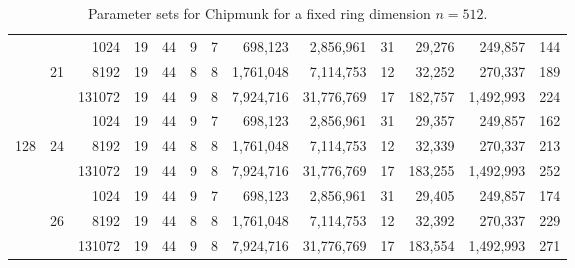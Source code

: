 \begin{table}
\begin{tabular}{ccr|c|cccrr|crr|c}
      &       &   1024 &         19 &        44 &          9 &       7 &        698,123 &  2,856,961 &    31 &       29,276 &   249,857 & 144 \\%
      &    21 &   8192 &         19 &        44 &          8 &       8 &      1,761,048 &  7,114,753 &    12 &       32,252 &   270,337 & 189 \\%
      &       & 131072 &         19 &        44 &          9 &       8 &      7,924,716 & 31,776,769 &    17 &      182,757 & 1,492,993 & 224 \\\cline{2-13}
  
      &       &   1024 &         19 &        44 &          9 &       7 &        698,123 &  2,856,961 &    31 &       29,357 &   249,857 & 162 \\%
  128 &    24 &   8192 &         19 &        44 &          8 &       8 &      1,761,048 &  7,114,753 &    12 &       32,339 &   270,337 & 213 \\%
      &       & 131072 &         19 &        44 &          9 &       8 &      7,924,716 & 31,776,769 &    17 &      183,255 & 1,492,993 & 252 \\\cline{2-13}
  
      &       &   1024 &         19 &        44 &          9 &       7 &        698,123 &  2,856,961 &    31 &       29,405 &   249,857 & 174 \\%
      &    26 &   8192 &         19 &        44 &          8 &       8 &      1,761,048 &  7,114,753 &    12 &       32,392 &   270,337 & 229 \\%
      &       & 131072 &         19 &        44 &          9 &       8 &      7,924,716 & 31,776,769 &    17 &      183,554 & 1,492,993 & 271 \\\bottomrule
    \end{tabular}
    \caption{Parameter sets for Chipmunk for a fixed ring dimension $n=512$.}\label{tab:param}
  \end{table}
\egroup

